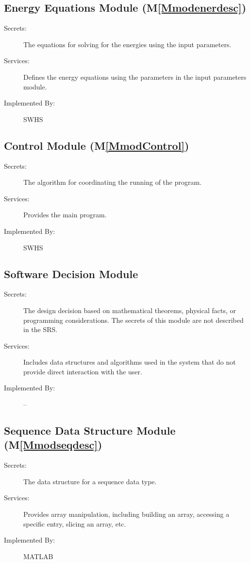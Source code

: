 \documentclass[12pt]{article}
\begin{document}
\subsection{Energy Equations Module (M\ref{Mmodenerdesc})}
\label{Sec:EnerEquaModu()}
\begin{description}
\item[Secrets:]The equations for solving for the energies using the input parameters.
\item[Services:]Defines the energy equations using the parameters in the input parameters module.
\item[Implemented By:]SWHS
\end{description}
\subsection{Control Module (M\ref{MmodControl})}
\label{Sec:CM()}
\begin{description}
\item[Secrets:]The algorithm for coordinating the running of the program.
\item[Services:]Provides the main program.
\item[Implemented By:]SWHS
\end{description}
\subsection{Software Decision Module}
\label{Sec:SDM}
\begin{description}
\item[Secrets:]The design decision based on mathematical theorems, physical facts, or programming considerations. The secrets of this module are not described in the SRS.
\item[Services:]Includes data structures and algorithms used in the system that do not provide direct interaction with the user.
\item[Implemented By:]--
\end{description}
\subsection{Sequence Data Structure Module (M\ref{Mmodseqdesc})}
\label{Sec:SDSM()}
\begin{description}
\item[Secrets:]The data structure for a sequence data type.
\item[Services:]Provides array manipulation, including building an array, accessing a specific entry, slicing an array, etc.
\item[Implemented By:]MATLAB
\end{description}
\end{document}
